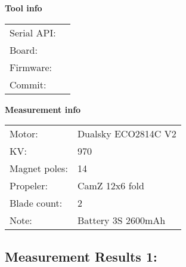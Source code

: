 \documentclass[10pt]{article}
\begin{document}
\noindent
{\large \bf Tool info}
\vspace{3mm}

\noindent
\begin{tabular}{ll}
Serial API:  & \\ 
Board:       & \\ 
Firmware:    & \\ 
Commit:      & 
\end{tabular}
\vspace{3mm}

\noindent
{\large \bf Measurement info}
\vspace{3mm}

\noindent
\begin{tabular}{ll}
Motor:        & Dualsky ECO2814C V2\\ 
KV:           & 970\\ 
Magnet poles: & 14\\ 
Propeler:     & CamZ 12x6 fold\\ 
Blade count:  & 2\\ 
Note:         & Battery 3S 2600mAh
\end{tabular}

\vspace{3mm}


\subsection*{\large \bf Measurement Results 1:}
\end{document}
